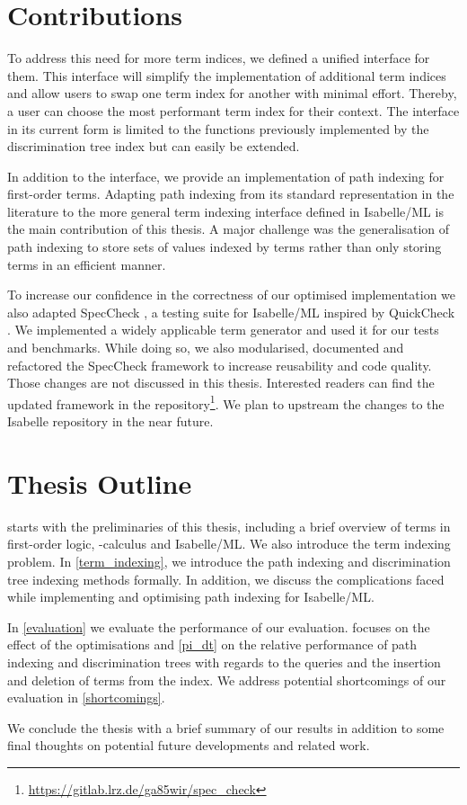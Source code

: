 \section{Contributions}
To address this need for more term indices, we defined a unified interface for them. This interface will simplify the implementation of additional term indices and allow users to swap one term index for another with minimal effort. Thereby, a user can choose the most performant term index for their context.
The interface in its current form is limited to the functions previously implemented by the discrimination tree index but can easily be extended.

In addition to the interface, we provide an implementation of path indexing for first-order terms. Adapting path indexing from its standard representation in the literature to the more general term indexing interface defined in Isabelle/ML is the main contribution of this thesis.
A major challenge was the generalisation of path indexing to store sets of values indexed by terms rather than only storing terms in an efficient manner.

To increase our confidence in the correctness of our optimised implementation we also adapted SpecCheck \cite{bulwahn_new_2012}, a testing suite for Isabelle/ML inspired by QuickCheck \cite{claessen_quickcheck_2011}.
We implemented a widely applicable term generator and used it for our tests and benchmarks.
While doing so, we also modularised, documented and refactored the SpecCheck framework to increase reusability and code quality.
Those changes are not discussed in this thesis.
Interested readers can find the updated framework in the repository\footnote{\url{https://gitlab.lrz.de/ga85wir/spec_check}}.
We plan to upstream the changes to the Isabelle repository in the near future.

\section{Thesis Outline}
 starts with the preliminaries of this thesis, including a brief overview of terms in first-order logic, \lam -calculus and Isabelle/ML. We also introduce the term indexing problem. In \cref{term_indexing}, we introduce the path indexing and discrimination tree indexing methods formally. In addition, we discuss the complications faced while implementing and optimising path indexing for Isabelle/ML.

In \cref{evaluation} we evaluate the performance of our evaluation.  focuses on the effect of the optimisations and \cref{pi_dt} on the relative performance of path indexing and discrimination trees with regards to the queries and the insertion and deletion of terms from the index. We address potential shortcomings of our evaluation in \cref{shortcomings}.

We conclude the thesis with a brief summary of our results in addition to some final thoughts on potential future developments and related work.

